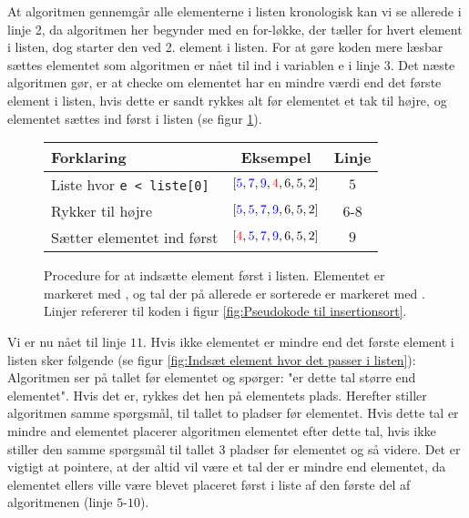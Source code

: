 At algoritmen gennemgår alle elementerne i listen kronologisk kan vi se allerede i linje 2, da algoritmen her begynder med en for-løkke, der tæller for hvert element i listen, dog starter den ved 2. element i listen. For at gøre koden mere læsbar sættes elementet som algoritmen er nået til ind i variablen e i linje 3. Det næste algoritmen gør, er at checke om elementet har en mindre værdi end det første element i listen, hvis dette er sandt rykkes alt før elementet et tak til højre, og elementet sættes ind først i listen (se figur \ref{fig:Indsæt element først i listen}).

\begin{figure}[h]
	\begin{center}
		\padtable
		\begin{tabular}{l|c|c}
			Forklaring & Eksempel & Linje \\
			\hline
			Liste hvor \verb|e < liste[0]| & $[\color{blue}5\color{black},\color{blue}7\color{black},\color{blue}9\color{black},\color{red}4\color{black},6,5,2]$ & $5$ \\
			Rykker til højre & $[\color{blue}5\color{black},\color{blue}5\color{black},\color{blue}7\color{black},\color{blue}9\color{black},6,5,2]$ & $6$-$8$\\
			Sætter elementet ind først  & $[\color{red}4\color{black},\color{blue}5\color{black},\color{blue}7\color{black},\color{blue}9\color{black},6,5,2]$ & $9$
		\end{tabular}
	\end{center}
	\vspace{-3mm}
	\caption{Procedure for at indsætte element først i listen. Elementet er markeret med , og tal der på allerede er sorterede er markeret med . Linjer refererer til koden i figur \ref{fig:Pseudokode til insertionsort}.}
	\label{fig:Indsæt element først i listen}
\end{figure}


Vi er nu nået til linje $11$. Hvis ikke elementet er mindre end det første element i listen sker følgende (se figur \ref{fig:Indsæt element hvor det passer i listen}): Algoritmen ser på tallet før elementet og spørger: "er dette tal større end elementet". Hvis det er, rykkes det hen på elementets plads. Herefter stiller algoritmen samme spørgsmål, til tallet to pladser før elementet. Hvis dette tal er mindre and elementet placerer algoritmen elementet efter dette tal, hvis ikke stiller den samme spørgsmål til tallet 3 pladser før elementet og så videre. Det er vigtigt at pointere, at der altid vil være et tal der er mindre end elementet, da elementet ellers ville være blevet placeret først i liste af den første del af algoritmenen (linje $5$-$10$).


